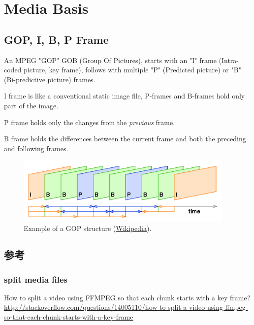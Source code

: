 \documentclass[letter,11pt,onecolumn]{book}
\title{\doctitle}
\author{\docauthor}
\begin{document}
\maketitle
\tableofcontents









\appendix

\chapter{Media Basis}

\section{GOP, I, B, P Frame}

An MPEG "GOP" GOB (Group Of Pictures), starts with an "I" frame (Intra-coded picture, key frame),
follows with multiple "P" (Predicted picture) or "B" (Bi-predictive picture) frames.

I frame is like a conventional static image file, P-frames and B-frames hold only part of the image.

P frame holds only the changes from the \emph{previous} frame.

B frame holds the differences between the current frame and both the preceding and following frames.


\begin{figure}\centering
  \includegraphics[width=0.95\textwidth]{figures-appconv2dash/gop-ipb.png}
  \caption{Example of a GOP structure (\href{http://en.wikipedia.org/wiki/Inter_frame}{Wikipedia}).}\label{fig:gopipb}
\end{figure}

\section{参考}

\subsection{split media files}
How to split a video using FFMPEG so that each chunk starts with a key frame?
\url{http://stackoverflow.com/questions/14005110/how-to-split-a-video-using-ffmpeg-so-that-each-chunk-starts-with-a-key-frame}
\end{document}
